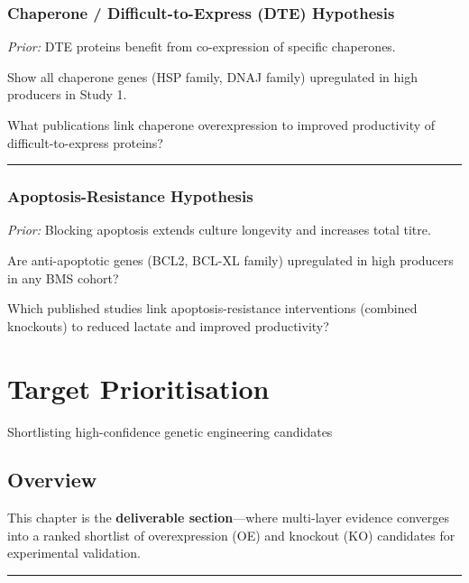 \documentclass[
  letterpaper,
  oneside,
  open=any]{scrbook}
\begin{document}
\subsection{Chaperone / Difficult-to-Express (DTE)
Hypothesis}\label{chaperone-difficult-to-express-dte-hypothesis}

\emph{Prior:} DTE proteins benefit from co-expression of specific
chaperones.

Show all chaperone genes (HSP family, DNAJ family) upregulated in high
producers in Study 1.

What publications link chaperone overexpression to improved productivity
of difficult-to-express proteins?

\begin{center}\rule{0.5\linewidth}{0.5pt}\end{center}

\subsection{Apoptosis-Resistance
Hypothesis}\label{apoptosis-resistance-hypothesis}

\emph{Prior:} Blocking apoptosis extends culture longevity and increases
total titre.

Are anti-apoptotic genes (BCL2, BCL-XL family) upregulated in high
producers in any BMS cohort?

Which published studies link apoptosis-resistance interventions
(combined knockouts) to reduced lactate and improved productivity?


\chapter{Target Prioritisation}\label{target-prioritisation}

Shortlisting high-confidence genetic engineering candidates

\hfill\break

\section{Overview}\label{sec-targets}

This chapter is the \textbf{deliverable section}---where multi-layer
evidence converges into a ranked shortlist of overexpression (OE) and
knockout (KO) candidates for experimental validation.

\begin{center}\rule{0.5\linewidth}{0.5pt}\end{center}
\end{document}
